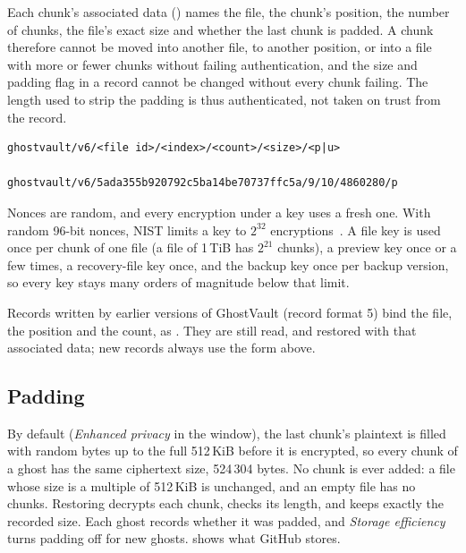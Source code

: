 Each chunk's associated data () names the file, the chunk's position, the number of
chunks, the file's exact size and whether the last chunk is padded. A chunk therefore cannot be
moved into another file, to another position, or into a file with more or fewer chunks without
failing authentication, and the size and padding flag in a record cannot be changed without every
chunk failing. The length used to strip the padding is thus authenticated, not taken on trust from
the record.

\begin{lstlisting}[basicstyle=\ttfamily\scriptsize,caption={Associated data of a chunk;
\code{p} or \code{u} says whether the last chunk is padded.},label={lst:aad}]
ghostvault/v6/<file id>/<index>/<count>/<size>/<p|u>

ghostvault/v6/5ada355b920792c5ba14be70737ffc5a/9/10/4860280/p
\end{lstlisting}

Nonces are random, and every encryption under a key uses a fresh one. With random 96-bit nonces,
NIST limits a key to $2^{32}$ encryptions~\cite[Sec.~8.3]{nist-gcm}. A file key is used once per
chunk of one file (a file of 1\,TiB has $2^{21}$ chunks), a preview key once or a few times, a
recovery-file key once, and the backup key once per backup version, so every key stays many orders of magnitude
below that limit.

Records written by earlier versions of GhostVault (record format 5) bind the file, the position and
the count, as . They are still read, and restored
with that associated data; new records always use the form above.

\subsection{Padding}\label{sec:padding}
By default (\emph{Enhanced privacy} in the window), the last chunk's plaintext is filled with
random bytes up to the full 512\,KiB before it is encrypted, so every chunk of a ghost has the same
ciphertext size, 524\,304 bytes. No chunk is ever added: a file whose size is a multiple of 512\,KiB
is unchanged, and an empty file has no chunks. Restoring decrypts each chunk, checks its length,
and keeps exactly the recorded size. Each ghost records whether it was padded, and \emph{Storage
efficiency} turns padding off for new ghosts.  shows what GitHub stores.

